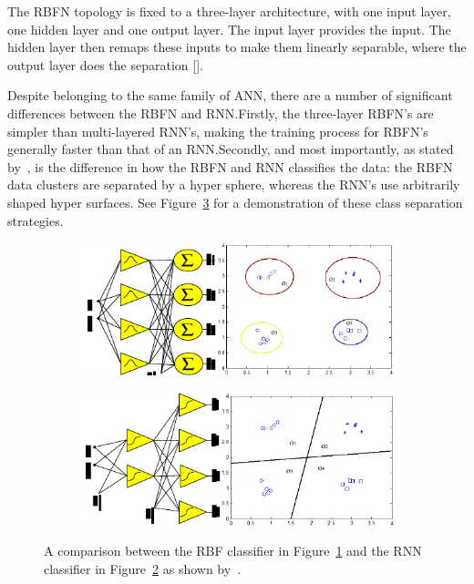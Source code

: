 The RBFN topology is fixed to a three-layer architecture, with one input layer, one hidden layer and one output layer. The input layer provides the input. The hidden layer then remaps these inputs to make them linearly separable, where the output layer does the separation [\cite{xie2011comparison}].  

Despite belonging to the same family of ANN, there are a number of significant differences between the RBFN and RNN.\@ Firstly, the three-layer RBFN's are simpler than multi-layered RNN's, making the training process for RBFN's generally faster than that of an RNN.\@ Secondly, and most importantly, as stated by~\citeauthor{xie2011comparison}, is the difference in how the RBFN and RNN classifies the data: the RBFN data clusters are separated by a hyper sphere, whereas the RNN's use arbitrarily shaped hyper surfaces. See Figure~\ref{fig:chap2-classifier} for a demonstration of these class separation strategies. 

\begin{figure}
  \centering
  \begin{subfigure}{0.5\textwidth}
    \includegraphics[width=\textwidth]{figures/chapter2/rbf_class}
    \caption{}
    \label{fig:chap2-rbf-classifier}
  \end{subfigure}
  \begin{subfigure}{0.5\textwidth}
    \includegraphics[width=\textwidth]{figures/chapter2/rnn_class}
    \caption{}
    \label{fig:chap2-rnn-classifier}
  \end{subfigure}
  \caption[A comparison between the RBF and RNN classifiers. ]{A comparison between the RBF classifier in Figure~\ref{fig:chap2-rbf-classifier} and the RNN classifier in Figure~\ref{fig:chap2-rnn-classifier} as shown by~\cite{xie2011comparison}. }
\label{fig:chap2-classifier}
\end{figure}

